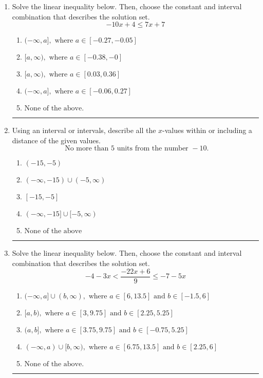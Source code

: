 \documentclass[14pt]{extbook}
\newcommand{\litem}[1]{\item#1\hspace*{-1cm}\rule{\textwidth}{0.4pt}}
\begin{document}
\begin{enumerate}
{\begin{enumerate}[label=\Alph*.]
\end{enumerate} }
\litem{
Solve the linear inequality below. Then, choose the constant and interval combination that describes the solution set.\[ -10x + 4 \leq 7x + 7 \]\begin{enumerate}[label=\Alph*.]
\item \( (-\infty, a], \text{ where } a \in [-0.27, -0.05] \)
\item \( [a, \infty), \text{ where } a \in [-0.38, -0] \)
\item \( [a, \infty), \text{ where } a \in [0.03, 0.36] \)
\item \( (-\infty, a], \text{ where } a \in [-0.06, 0.27] \)
\item \( \text{None of the above}. \)

\end{enumerate} }
\litem{
Using an interval or intervals, describe all the $x$-values within or including a distance of the given values.\[ \text{ No more than } 5 \text{ units from the number } -10. \]\begin{enumerate}[label=\Alph*.]
\item \( (-15, -5) \)
\item \( (-\infty, -15) \cup (-5, \infty) \)
\item \( [-15, -5] \)
\item \( (-\infty, -15] \cup [-5, \infty) \)
\item \( \text{None of the above} \)

\end{enumerate} }
\litem{
Solve the linear inequality below. Then, choose the constant and interval combination that describes the solution set.\[ -4 - 3 x < \frac{-22 x + 6}{9} \leq -7 - 5 x \]\begin{enumerate}[label=\Alph*.]
\item \( (-\infty, a] \cup (b, \infty), \text{ where } a \in [6, 13.5] \text{ and } b \in [-1.5, 6] \)
\item \( [a, b), \text{ where } a \in [3, 9.75] \text{ and } b \in [2.25, 5.25] \)
\item \( (a, b], \text{ where } a \in [3.75, 9.75] \text{ and } b \in [-0.75, 5.25] \)
\item \( (-\infty, a) \cup [b, \infty), \text{ where } a \in [6.75, 13.5] \text{ and } b \in [2.25, 6] \)
\item \( \text{None of the above.} \)


\end{enumerate}}
\end{enumerate}
\end{document}
